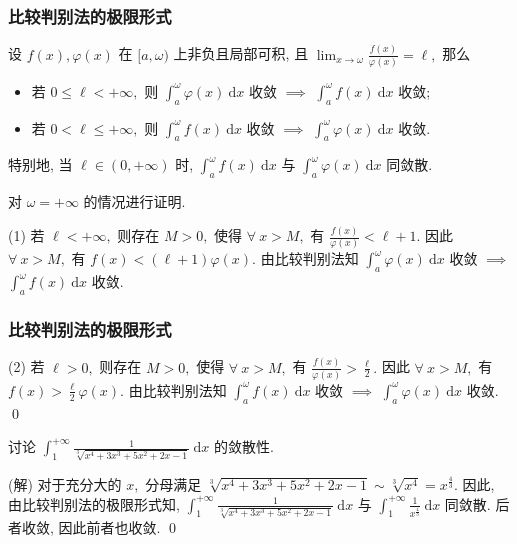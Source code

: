 \begin{frame}
\frametitle{比较判别法的极限形式}

\begin{cor}[比较判别法的极限形式]
设 $f(x), \varphi(x)$ 在 $[a, \omega)$ 上非负且局部可积, 且 $\displaystyle \lim_{x \to \omega} \frac{f(x)}{\varphi(x)} = \ell,$ 那么
\begin{itemize}
\item 若 $0 \leqslant \ell < +\infty,$ 则 $\int_a^{\omega} \varphi(x) ~ \mathrm{d} x$ 收敛 $\implies$ $\int_a^{\omega} f(x) ~ \mathrm{d} x$ 收敛;
\item 若 $0 < \ell \leqslant +\infty,$ 则 $\int_a^{\omega} f(x) ~ \mathrm{d} x$ 收敛 $\implies$ $\int_a^{\omega} \varphi(x) ~ \mathrm{d} x$ 收敛.
\end{itemize}
特别地, 当 $\ell \in (0, +\infty)$ 时, $\int_a^{\omega} f(x) ~ \mathrm{d} x$ 与 $\int_a^{\omega} \varphi(x) ~ \mathrm{d} x$ 同敛散.
\end{cor}

\pause

\startproof[bg=yellow, fg=red]
对 $\omega = +\infty$ 的情况进行证明.

(1) 若 $\ell < +\infty,$ 则存在 $M > 0,$ 使得 $\forall~x > M,$ 有 $\frac{f(x)}{\varphi(x)} < \ell + 1.$ 因此 $\forall~x > M,$ 有 $f(x) < (\ell + 1) \varphi(x).$ 由比较判别法知 $\int_a^{\omega} \varphi(x) ~ \mathrm{d} x$ 收敛 $\implies$ $\int_a^{\omega} f(x) ~ \mathrm{d} x$ 收敛.

\end{frame}


\begin{frame}
\frametitle{比较判别法的极限形式}

(2) 若 $\ell > 0,$ 则存在 $M > 0,$ 使得 $\forall~x > M,$ 有 $\frac{f(x)}{\varphi(x)} > \frac{\ell}{2}.$ 因此 $\forall~x > M,$ 有 $f(x) > \frac{\ell}{2} \varphi(x).$ 由比较判别法知 $\int_a^{\omega} f(x) ~ \mathrm{d} x$ 收敛 $\implies$ $\int_a^{\omega} \varphi(x) ~ \mathrm{d} x$ 收敛.
\qed

\pause
\vspace{1em}

\begin{eg}
讨论 $\displaystyle \int_1^{+\infty} \frac{1}{\sqrt[3]{x^4 + 3x^3 + 5x^2 + 2x - 1}} ~ \mathrm{d} x$ 的敛散性.
\end{eg}

\pause
\vspace{0.5em}

\startproof[bg=yellow, fg=red](解)
对于充分大的 $x,$ 分母满足 $\sqrt[3]{x^4 + 3x^3 + 5x^2 + 2x - 1} \sim \sqrt[3]{x^4} = x^{\frac{4}{3}}.$ 因此, 由比较判别法的极限形式知, $\displaystyle \int_1^{+\infty} \frac{1}{\sqrt[3]{x^4 + 3x^3 + 5x^2 + 2x - 1}} ~ \mathrm{d} x$ 与 $\displaystyle \int_1^{+\infty} \frac{1}{x^{\frac{4}{3}}} ~ \mathrm{d} x$ 同敛散. 后者收敛, 因此前者也收敛.
\qed

\end{frame}

